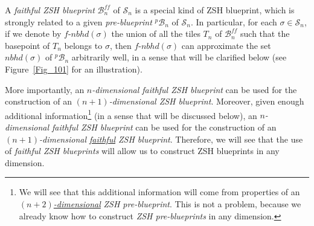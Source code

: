 \documentclass[12pt,letterpaper]{article}
\renewcommand{\S}{\mathcal{S}}
\newcommand{\B}{\mathcal{B}}
\newcommand{\nbhd}{\mathit{nbhd}}
\begin{document}
A {\em faithful ZSH blueprint} $\B_n^\mathit{ff}$  of $\S_n$ is a special kind of ZSH blueprint, which is strongly related to a given {\em pre-blueprint} $^p\!\B_n$ of $\S_n$. In particular,  for each $\sigma \in \S_n$, if we denote by $f$-$\nbhd(\sigma)$ the union of all the tiles $T_n$ of $\B_n^\mathit{ff}$ such that the basepoint of $T_n$ belongs to $\sigma$, then $f$-$\nbhd(\sigma)$ can approximate the set  $\nbhd(\sigma)$ of $^p\!\B_n$ arbitrarily well, in a sense that will be clarified below (see Figure~\ref{Fig_101} for an illustration). 


More importantly, an {\em $n$-dimensional   faithful ZSH blueprint} can be used for the construction of an {\em $(n+1)$-dimensional  ZSH blueprint}. Moreover, given enough additional information\footnote{We will see that this additional information will come from properties of an \ul{\em $(n+2)$-dimensional}  {\em ZSH pre-blueprint}. This is not a problem, because we already know how to construct {\em ZSH pre-blueprints} in any dimension.} (in a sense that will be discussed below),  an {\em $n$-dimensional  faithful ZSH blueprint}  can be used for the construction of an {\em $(n+1)$-dimensional  \ul{faithful}  ZSH blueprint}. Therefore, we will see that the use of {\em faithful ZSH blueprints} will allow us to construct ZSH blueprints in any dimension. 
\end{document}
